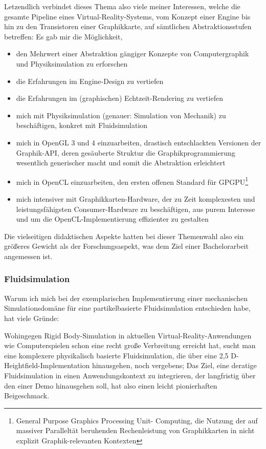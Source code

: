 Letzendlich verbindet dieses Thema also viele meiner Interessen, welche die gesamte Pipeline eines Virtual-Reality-Systems,  vom Konzept einer Engine bis hin zu den Transistoren einer Graphikkarte, auf sämtlichen Abstraktionsstufen betreffen: Es gab mir die Möglichkeit,
\begin{itemize}
	\label{list:didacticGoals}
	\item den Mehrwert einer Abstraktion gängiger Konzepte von Computergraphik und Physiksimulation zu erforschen
	\item die Erfahrungen im Engine-Design zu vertiefen
	\item die Erfahrungen im (graphischen) Echtzeit-Rendering zu vertiefen
	\item mich mit Physiksimulation (genauer: Simulation von Mechanik) zu beschäftigen, konkret mit Fluidsimulation
	
	\item mich in OpenGL 3 und 4 einzuarbeiten, drastisch entschlackten Versionen der Graphik-API, deren gesäuberte Struktur die Graphikprogrammierung wesentlich generischer macht und somit die Abstraktion erleichtert
	\item mich in OpenCL einzuarbeiten, den ersten offenen Standard für \linebreak GPGPU\footnote{General Purpose Graphics Processing Unit- Computing, die Nutzung der auf massiver Paralleltät beruhenden Rechenleistung von Graphikkarten in nicht explizit Graphik-relevanten Kontexten}
	\item  mich intensiver mit Graphikkarten-Hardware, der zu Zeit komplexesten und leistungsfähigsten Consumer-Hardware zu beschäftigen, aus purem Interesse und um die OpenCL-Implementierung effizienter zu gestalten
\end{itemize}
Die vielseitigen didaktischen Aspekte hatten bei dieser Themenwahl also ein größeres Gewicht als der Forschungsaspekt, was dem Ziel einer Bachelorarbeit angemessen ist. 


\subsubsection{Fluidsimulation}

Warum ich mich bei der exemplarischen Implementierung einer mechanischen Simulationsdomäne für eine partikelbasierte Fluidsimulation entschieden habe, hat viele Gründe:

Wohingegen Rigid Body-Simulation in aktuellen Virtual-Reality-Anwendungen wie Computerspielen schon eine recht große Verbreitung erreicht hat, sucht man eine komplexere physikalisch basierte Fluidsimulation, die über eine 2,5 D- Heightfield-Implementation hinausgehen, noch vergebens; 
Das Ziel, eine deratige Fluidsimulation in einen Anwendungskontext zu integrieren, der langfristig über den einer Demo hinausgehen soll, hat also einen leicht pionierhaften Beigeschmack.

